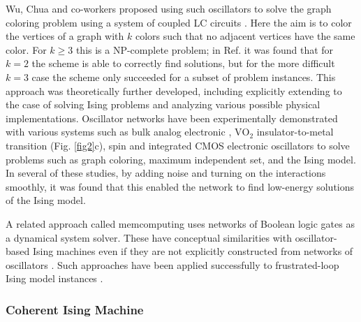 \documentclass[fleqn,10pt]{wlscirep}
\def\change#1{#1}
\begin{document}
Wu, Chua and co-workers proposed using such oscillators to solve the graph coloring problem using a system of coupled LC circuits \cite{wu1995application,wu1998graph}.
Here the aim is to color the vertices of a graph with $ k $ colors such that no adjacent vertices have the same color.  For $ k\ge 3$ this is a NP-complete problem; in Ref. \cite{wu1995application} it was found that for $ k = 2$ the scheme is able to correctly find solutions, but for the more difficult $ k = 3$ case the scheme only succeeded for a subset of problem instances.  This approach was theoretically further developed, 
\change{including explicitly extending to the case of solving Ising problems and analyzing various possible physical implementations\cite{wu2011clustering,kalinin2018global,wang2019oim,afoakwa2021brim,mcgoldrick2021ising,albertsson2021ultrafast}.} Oscillator networks have been experimentally demonstrated with various systems such as bulk analog electronic \cite{wang2019oim,chou2019analog,xiao2019optoelectronics,saito2020amoeba}, 
$ \text{VO}_2$ insulator-to-metal transition  \cite{shukla2014synchronized,parihar2017vertex,dutta2020ising} (Fig. \ref{fig2}c)\change{, spin\cite{zahedinejad2020two,houshang2020spin}} and integrated CMOS electronic \cite{mallick2020using,bashar2020experimental,ahmed2021probabilistic} oscillators to solve problems such as graph coloring, maximum independent set, and the Ising model. In several of these studies, by adding noise and turning on the interactions smoothly, it was found that this enabled the network to find low-energy solutions of the Ising model. 

\change{A related approach called memcomputing uses networks of Boolean logic gates as a  dynamical system solver.  These have conceptual similarities with oscillator-based Ising machines even if they are not explicitly constructed from networks of oscillators \cite{traversa2015universal,diventra2018perspective}. Such approaches have been applied successfully to frustrated-loop Ising model instances \cite{sheldon2019taming,aiken2020memcomputing}.    }



\subsubsection*{Coherent Ising Machine}
\end{document}
